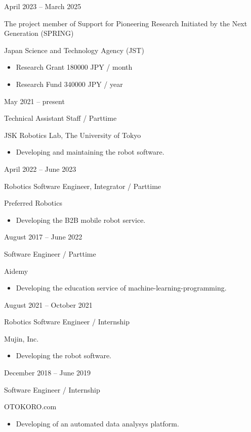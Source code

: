 \documentclass[a4paper,10pt]{article}
\newlength{\cvcolumngapwidth}
\newlength{\cvleftcolumnwidth}
\newlength{\cvrightcolumnwidth}
\newcommand{\cvtitlestyle}[1]{{\large\cvtitlefont\textcolor{cvtitlecolor}{#1}}}
\newcommand{\cvdurationstyle}[1]{{\small\cvdurationfont\textcolor{cvdurationcolor}{#1}}}
\newlength{\cvafteritemskipamount}
\newlength{\cvaftertitleskipamount}
\newlength{\cvparskip}
\newcommand{\cvitem}[2]{
    \begin{minipage}[t]{\cvleftcolumnwidth}
        \raggedleft #1
    \end{minipage}%
    \hspace{\cvcolumngapwidth}%
    \begin{minipage}[t]{\cvrightcolumnwidth}
        \setlength{\parskip}{\cvparskip} #2
    \end{minipage}

    \vspace{\cvafteritemskipamount}
}
\newcommand{\cvtitle}[1]{
    \cvtitlestyle{#1}

    \vspace{\cvaftertitleskipamount}
    \vspace{-\cvparskip}
}
\begin{document}
\cvitem{
  \cvdurationstyle{April 2023 -- March 2025}
}{
  \cvtitle{The project member of Support for Pioneering Research Initiated by the Next Generation (SPRING)}

  Japan Science and Technology Agency (JST)

  \begin{itemize}[leftmargin=*]
  \item Research Grant 180000 JPY / month
  \item Research Fund 340000 JPY / year
  \end{itemize}
}

\cvitem{
  \cvdurationstyle{May 2021 -- present}
}{
  \cvtitle{Technical Assistant Staff / Parttime}

  JSK Robotics Lab, The University of Tokyo

  \begin{itemize}[leftmargin=*]
    \item Developing and maintaining the robot software.
  \end{itemize}
}

\cvitem{
  \cvdurationstyle{April 2022 -- June 2023}
}{
  \cvtitle{Robotics Software Engineer, Integrator / Parttime}

  Preferred Robotics

  \begin{itemize}[leftmargin=*]
    \item Developing the B2B mobile robot service.
  \end{itemize}
}

\cvitem{
  \cvdurationstyle{August 2017 -- June 2022}
}{
  \cvtitle{Software Engineer / Parttime}

  Aidemy

  \begin{itemize}[leftmargin=*]
    \item Developing the education service of machine-learning-programming.
  \end{itemize}
}

\cvitem{
  \cvdurationstyle{August 2021 -- October 2021}
}{
  \cvtitle{Robotics Software Engineer / Internship}

  Mujin, Inc.

  \begin{itemize}[leftmargin=*]
    \item Developing the robot software.
  \end{itemize}
}

\cvitem{
  \cvdurationstyle{December 2018 -- June 2019}
}{
  \cvtitle{Software Engineer / Internship}
  OTOKORO.com
  \begin{itemize}[leftmargin=*]
    \item Developing of an automated data analysys platform.
  \end{itemize}
}
\end{document}
